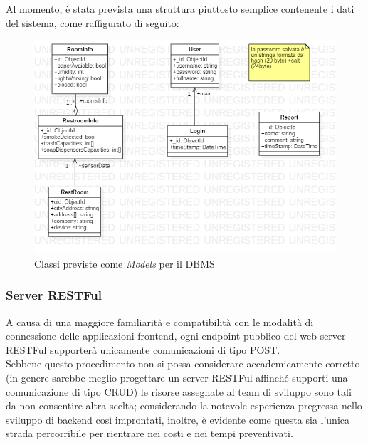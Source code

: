 \documentclass[12pt]{article}
\begin{document}
Al momento, è stata prevista una struttura piuttosto semplice contenente i dati del sistema, come raffigurato di seguito:
\begin{figure}[h!]
\centering
  \includegraphics[scale=0.60]{img/class-diagram.png}
  \caption{Classi previste come \textit{Models} per il DBMS}
\end{figure}
\newpage
\subsubsection{Server RESTFul}
A causa di una maggiore familiarità e compatibilità con le modalità di connessione delle applicazioni frontend, ogni endpoint pubblico del web server RESTFul supporterà unicamente comunicazioni di tipo POST.\\
Sebbene questo procedimento non si possa considerare accademicamente corretto (in genere sarebbe meglio progettare un server RESTFul affinché supporti una comunicazione di tipo CRUD) le risorse assegnate al team di sviluppo sono tali da non consentire altra scelta; considerando la notevole esperienza pregressa nello sviluppo di backend così improntati, inoltre, è evidente come questa sia l'unica strada percorribile per rientrare nei costi e nei tempi preventivati.\\
\end{document}
